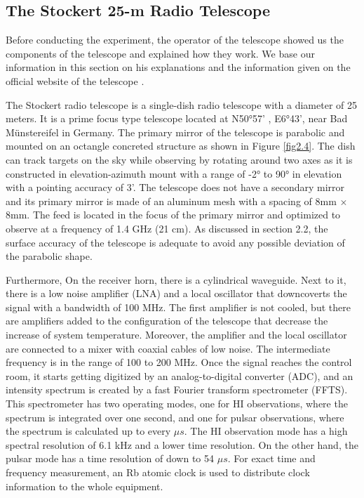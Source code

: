 \documentclass[12pt]{article}
\begin{document}
    \subsection{The Stockert 25-m Radio Telescope}
    Before conducting the experiment, the operator of the telescope showed us the components of the telescope and explained how they work. We base our information in this section on his explanations and the information given on the official website of the telescope \cite{accuracy}.
    
    The Stockert radio telescope is a single-dish radio telescope with a diameter of 25 meters. It is a prime focus type telescope located at N50°57'
, E6°43', near Bad Münstereifel in Germany. The primary mirror of the telescope is parabolic and mounted on an octangle concreted structure as shown in Figure \ref{fig2.4}. The dish can track targets on the sky while observing by rotating around two axes as it is constructed in elevation-azimuth mount with a range of -2° to 90° in elevation with a pointing accuracy of 3'.  The telescope does not have a secondary mirror and its primary mirror is made of an aluminum mesh with a spacing of 8mm $\times$ 8mm. The feed is located in the focus of the primary mirror and optimized to observe at a frequency of 1.4 GHz (21 cm). As discussed in section 2.2, the surface accuracy of the telescope is adequate to avoid any possible deviation of the parabolic shape. 

Furthermore, On the receiver horn, there is a cylindrical waveguide. Next to it, there is a low noise amplifier (LNA) and a local oscillator that downcoverts the signal with a bandwidth of 100 MHz.  The first amplifier is not cooled, but there are amplifiers added to the configuration of the telescope that decrease the increase of system temperature. Moreover, the amplifier and the local oscillator are connected to a mixer with coaxial cables of low noise. The intermediate frequency is in the range of 100 to 200 MHz. Once the signal reaches the control room, it starts getting digitized by an analog-to-digital converter (ADC), and an intensity spectrum is created by a fast Fourier transform spectrometer (FFTS). This spectrometer has two operating modes, one for HI observations, where the spectrum is integrated over one second, and one for pulsar observations, where the spectrum is calculated up to every $\mu s$. The HI observation mode has a high spectral resolution of 6.1 kHz and a lower time resolution. On the other hand, the pulsar mode has a time resolution of down to 54 $\mu s$. For exact time and frequency measurement, an Rb atomic clock is used to distribute clock information to the whole equipment.  
\end{document}
